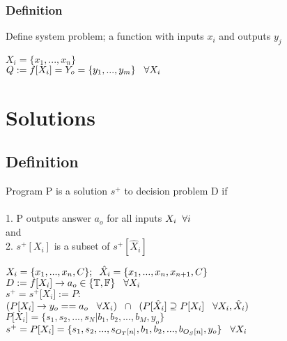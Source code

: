 \documentclass[11pt]{article}
\begin{document}
\subsubsection{Definition}
Define system problem; a function with inputs $x_i$ and outputs $y_j$
\begin{center}
$
X_i = \{x_1,...,x_n\}
$
\\ \vspace{2mm}
$
Q := f \lbrack X_i \rbrack = Y_{o} = \{y_1,...,y_m\} \hspace{3mm} \forall X_i
$
\end{center}






\section{Solutions}

\subsection{Definition}
Program P is a solution $s^{+}$ to decision problem D if \\\\
1. P outputs answer $a_o$ for all inputs $X_i \hspace{2mm} \forall i$\\
and \\
2. $s^{+}[X_i]$ is a subset of $s^{+}[\hat{X}_i]$
\begin{center}
\vspace{2mm}
$
X_i = \{x_1,...,x_n,C\}; \hspace{2mm} \hat{X}_i = \{x_1,...,x_n,x_{n+1},C\}
$
\\ \vspace{2mm}
$
D := f \lbrack X_i \rbrack \rightarrow a_{o} \in \{\mathbb{T}, \mathbb{F}\} \hspace{3mm} \forall X_i
$
\\ \vspace{2mm}
$
s^+ = s^+\lbrack X_i \rbrack := P :
$
\\ \vspace{2mm}
$
(P \lbrack X_i \rbrack \rightarrow y_{o} == a_{o} \hspace{3mm} \forall X_i) \hspace{2mm} \cap \hspace{2mm} (P[\hat{X}_i] \supseteq P[X_i] \hspace{3mm} \forall X_i,\hat{X}_i)
$
\\ \vspace{4mm}
$
P \lbrack X_i \rbrack = \{ s_1,s_2,...,s_N| b_1, b_2,...,b_M,y_o\}
$
\\ \vspace{3mm}
$
s^+ = P \lbrack X_i \rbrack = \{ s_1,s_2,...,s_{O_T \lbrack n \rbrack }, b_1, b_2,...,b_{O_S \lbrack n \rbrack},y_o \} \hspace{3mm} \forall X_i
$
\end{center}
\end{document}
